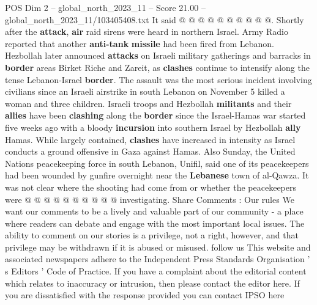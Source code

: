 \begin{textsample}{POS Dim 2 – global\_north\_2023\_11 – Score 21.00 – global\_north\_2023\_11/103405408.txt}
It said @ @ @ @ @ @ @ @ @ @.
Shortly after the \textbf{attack}, \textbf{air} raid sirens were heard in northern Israel.
Army Radio reported that another \textbf{anti-tank} \textbf{missile} had been fired from Lebanon.
Hezbollah later announced \textbf{attacks} on Israeli military gatherings and barracks in \textbf{border} areas Birket Riche and Zareit, as \textbf{clashes} continue to intensify along the tense Lebanon-Israel \textbf{border}.
The assault was the most serious incident involving civilians since an Israeli airstrike in south Lebanon on November 5 killed a woman and three children.
Israeli troops and Hezbollah \textbf{militants} and their \textbf{allies} have been \textbf{clashing} along the \textbf{border} since the Israel-Hamas war started five weeks ago with a bloody \textbf{incursion} into southern Israel by Hezbollah \textbf{ally} Hamas.
While largely contained, \textbf{clashes} have increased in intensity as Israel conducts a ground offensive in Gaza against Hamas.
Also Sunday, the United Nations peacekeeping force in south Lebanon, Unifil, said one of its peacekeepers had been wounded by gunfire overnight near the \textbf{Lebanese} town of al-Qawza.
It was not clear where the shooting had come from or whether the peacekeepers were @ @ @ @ @ @ @ @ @ @ investigating.
Share Comments : Our rules We want our comments to be a lively and valuable part of our community - a place where readers can debate and engage with the most important local issues.
The ability to comment on our stories is a privilege, not a right, however, and that privilege may be withdrawn if it is abused or misused. follow us This website and associated newspapers adhere to the Independent Press Standards Organisation ' s Editors ' Code of Practice.
If you have a complaint about the editorial content which relates to inaccuracy or intrusion, then please contact the editor here.
If you are dissatisfied with the response provided you can contact IPSO here

\end{textsample}
